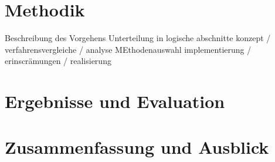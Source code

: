 \documentclass{article}
\begin{document}
\section{Methodik}
Beschreibung des Vorgehens
Unterteilung in logische abschnitte
konzept / verfahrensvergleiche / analyse MEthodenauswahl
implementierung / erinscrämungen / realisierung
\section{Ergebnisse und Evaluation}

\section{Zusammenfassung und Ausblick}
{}

\end{document}

